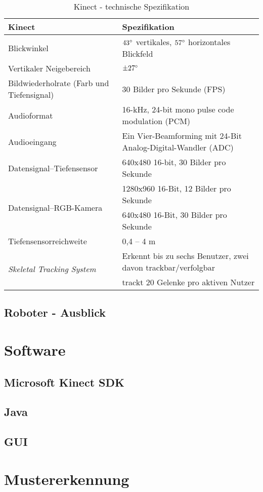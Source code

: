 \begin{table} [H] %
\begin{center}
\caption[Caption for LOF]{Kinect - technische Spezifikation \footnotemark[1]}
\label{tab:Kinect - technische Spezifikation}
\begin{tabular}{|p{5.7cm}|p{9cm}|}
\hline
\textbf{Kinect} & \textbf{Spezifikation} \\
\hline
Blickwinkel & $43\degree$ vertikales, $57\degree$ horizontales Blickfeld \\
\hline
Vertikaler Neigebereich & $\pm 27\degree$ \\
\hline
Bildwiederholrate (Farb und Tiefensignal) & 30 Bilder pro Sekunde (FPS) \\
\hline
Audioformat & 16-kHz, 24-bit mono pulse code modulation (PCM)\\
\hline
Audioeingang & Ein Vier-\gls{Beamforming} mit 24-Bit Analog-Digital-Wandler (ADC)\\
\hline
Datensignal--Tiefensensor & 640x480 16-bit, 30 Bilder pro Sekunde \\
\hline
\multirow{2}{*}{Datensignal--RGB-Kamera} & 1280x960 16-Bit, 12 Bilder pro Sekunde\\
& 640x480 16-Bit, 30 Bilder pro Sekunde \\
\hline
Tiefensensorreichweite & 0,4 -- 4 m\\
\hline
\multirow{2}{*}{
\textit{Skeletal Tracking System}} & Erkennt bis zu sechs Benutzer, zwei davon trackbar/verfolgbar\\
& trackt 20 Gelenke pro aktiven Nutzer\\
\hline
\end{tabular}
\end{center}
\end{table}


\subsection {Roboter - Ausblick}
\section{Software}

\subsection{Microsoft Kinect SDK}
\subsection{Java}

\subsection{GUI}

\section{Mustererkennung}
